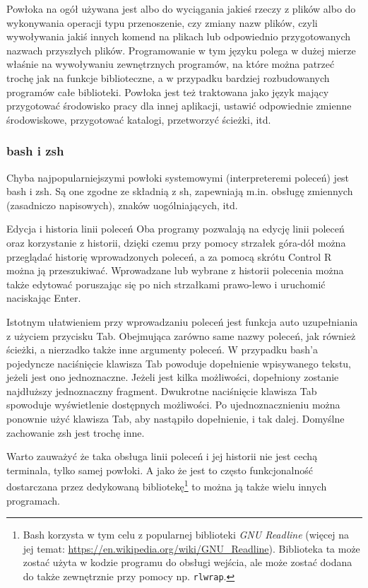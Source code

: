 Powłoka na ogół używana jest albo do wyciągania jakieś rzeczy z plików albo do wykonywania operacji typu przenoszenie, czy zmiany nazw plików, czyli wywoływania jakiś innych komend na plikach lub odpowiednio przygotowanych nazwach przyszłych plików. Programowanie w tym języku polega w dużej mierze właśnie na wywoływaniu zewnętrznych programów, na które można patrzeć trochę jak na funkcje biblioteczne, a w przypadku bardziej rozbudowanych programów całe biblioteki. Powłoka jest też traktowana jako język mający przygotować środowisko pracy dla innej aplikacji, ustawić odpowiednie zmienne środowiskowe, przygotować katalogi, przetworzyć ścieżki, itd.

\subsubsection{bash i zsh}

Chyba najpopularniejszymi powłoki systemowymi (interpreteremi poleceń) jest bash i zsh. Są one zgodne ze składnią z sh, zapewniają m.in. obsługę zmiennych (zasadniczo napisowych), znaków uogólniających, itd.

\begin{ProTip}[breakable]{Edycja i historia linii poleceń}
	Oba programy pozwalają na edycję linii poleceń oraz korzystanie z historii, dzięki czemu przy pomocy strzałek góra-dół można przeglądać historię wprowadzonych poleceń, a za pomocą skrótu Control R można ją przeszukiwać. Wprowadzane lub wybrane z historii polecenia można także edytować poruszając się po nich strzałkami prawo-lewo i uruchomić naciskając Enter.
	
	Istotnym ułatwieniem przy wprowadzaniu poleceń jest funkcja auto uzupełniania z użyciem przycisku Tab. Obejmująca zarówno same nazwy poleceń, jak również ścieżki, a nierzadko także inne argumenty poleceń. W przypadku bash'a pojedyncze naciśnięcie klawisza Tab powoduje dopełnienie wpisywanego tekstu, jeżeli jest ono jednoznaczne. Jeżeli jest kilka możliwości, dopełniony zostanie najdłuższy jednoznaczny fragment. Dwukrotne naciśnięcie klawisza Tab spowoduje wyświetlenie dostępnych możliwości. Po ujednoznacznieniu można ponownie użyć klawisza Tab, aby nastąpiło dopełnienie, i tak dalej. Domyślne zachowanie zsh jest trochę inne.
	
	Warto zauważyć że taka obsługa linii poleceń i jej historii nie jest cechą terminala, tylko samej powłoki.
	A jako że jest to często funkcjonalność dostarczana przez dedykowaną bibliotekę\footnote{
		Bash korzysta w tym celu z popularnej biblioteki \textit{GNU Readline} (więcej na jej temat: \url{https://en.wikipedia.org/wiki/GNU\_Readline}).
		Biblioteka ta może zostać użyta w kodzie programu do obsługi wejścia, ale może zostać dodana do także zewnętrznie przy pomocy np. \Verb$rlwrap$.
	}
	to można ją także wielu innych programach.
\end{ProTip}

